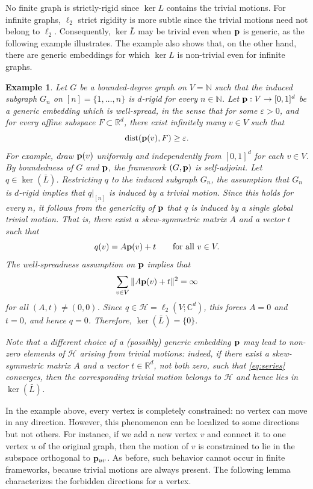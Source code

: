 \documentclass[10pt,a4paper]{amsart}
\numberwithin{equation}{section}
\newtheorem{example}[theorem]{Example}
\newcommand{\N}{\mathbb N}
\newcommand{\R}{\mathbb R}
\newcommand{\C}{\mathbb C}
\newcommand{\cH}{\mathcal H}
\newcommand{\p}{{\bf p}}
\DeclareMathOperator{\dist}{dist}
\begin{document}
No finite graph is strictly-rigid since \(\ker L\) contains the trivial motions.
For infinite graphs, $\ell_2$ strict rigidity is more subtle since the trivial motions need not belong to
\(\ell_2\). Consequently, \(\ker \bar L\) may be trivial even when
\(\p\) is generic, as the following example illustrates. The example
also shows that, on the other hand, there are generic
embeddings for which \(\ker L\) is non-trivial even for infinite graphs.

\begin{example}\label{ex:strictly_rigid}
Let $G$ be a bounded-degree graph on $V=\N$ such that the induced subgraph $G_n$ on
$[n]=\{1,\dots,n\}$ is $d$-rigid for every $n\in\N$. Let $\p:V\to[0,1]^d$ be a generic embedding which is \emph{well-spread}, in the sense that for some $\varepsilon>0$, and for every affine subspace $F\subset\R^d$, there exist infinitely many $v\in V$ such that
\[
\dist(\p(v),F)\ge \varepsilon.
\]
For example, draw $\p(v)$ uniformly and independently from $[0,1]^d$ for each $v\in V$.
By boundedness of $G$ and $\p$, the framework $(G,\p)$ is self-adjoint. Let $q\in\ker(\bar L)$. Restricting $q$ to the induced subgraph $G_n$, the
assumption that $G_n$ is $d$-rigid implies that $q|_{[n]}$ is induced by a trivial motion. Since this holds for every $n$, it follows from the genericity of $\p$ that $q$ is induced by a single global trivial motion. That is, there exist a skew-symmetric matrix $A$ and a vector $t$ such that
\[
q(v)=A\p(v)+t \qquad \text{for all } v\in V.
\]
The well-spreadness assumption on $\p$ implies that
\begin{equation}\label{eq:series}
\sum_{v\in V}\|A\p(v)+t\|^2 = \infty
\end{equation}
for all $(A,t)\neq(0,0)$. Since $q\in\cH=\ell_2(V;\C^d)$, this forces $A=0$ and $t=0$, and hence $q=0$. Therefore,
$
\ker(\bar L)=\{0\}.
$

Note that a different choice of a (possibly) generic embedding $\p$ may lead to non-zero elements of $\cH$ arising from trivial motions: indeed, if there exist a skew-symmetric matrix $A$ and a vector $t\in\R^d$, not both zero, such that \eqref{eq:series} converges, then the corresponding trivial motion belongs to $\cH$ and hence lies in $\ker(\bar L)$.
\end{example}

In the example above, every vertex is completely constrained: no vertex
can move in any direction. However, this phenomenon can be localized to
some directions but not others. For instance, if we add a new vertex \(v\)
and connect it to one vertex \(u\) of the original graph, then the motion
of \(v\) is constrained to lie in the subspace orthogonal to \(\p_{uv}\).
As before, such behavior cannot occur in finite frameworks, because
trivial motions are always present. The following lemma characterizes the
forbidden directions for a vertex.
\end{document}
